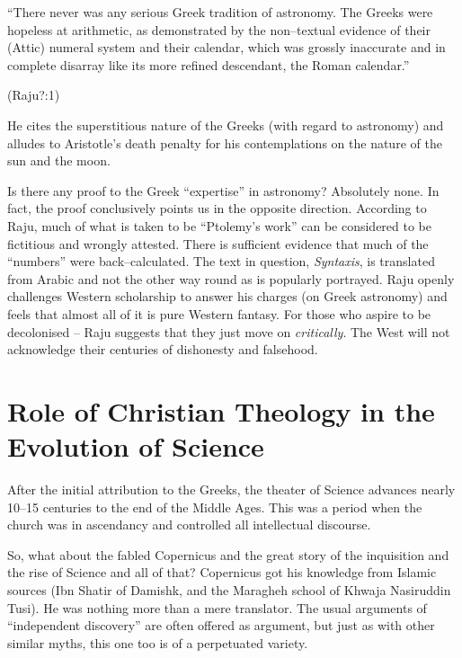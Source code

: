 \begin{myquote}
“There never was any serious Greek tradition of astronomy. The Greeks were hopeless at arithmetic, as demonstrated by the non–textual evidence of their (Attic) numeral system and their calendar, which was grossly inaccurate and in complete disarray like its more refined descendant, the Roman calendar.”
\end{myquote}

\hfill (Raju?:1)

He cites the superstitious nature of the Greeks (with regard to astronomy) and alludes to Aristotle’s death penalty for his contemplations on the nature of the sun and the moon.

Is there any proof to the Greek “expertise” in astronomy? Absolutely none. In fact, the proof conclusively points us in the opposite direction. According to Raju, much of what is taken to be “Ptolemy’s work” can be considered to be fictitious and wrongly attested. There is sufficient evidence that much of the “numbers” were back–calculated. The text in question, \textit{Syntaxis}, is translated from Arabic and not the other way round as is popularly portrayed. Raju openly challenges Western scholarship to answer his charges (on Greek astronomy) and feels that almost all of it is pure Western fantasy. For those who aspire to be decolonised – Raju suggests that they just move on \textit{critically}. The West will not acknowledge their centuries of dishonesty and falsehood.


\section*{Role of Christian Theology in the Evolution of Science}

After the initial attribution to the Greeks, the theater of Science advances nearly 10–15 centuries to the end of the Middle Ages. This was a period when the church was in ascendancy and controlled all intellectual discourse.

So, what about the fabled Copernicus and the great story of the inquisition and the rise of Science and all of that? Copernicus got his knowledge from Islamic sources (Ibn Shatir of Damishk, and the Maragheh school of Khwaja Nasiruddin Tusi). He was nothing more than a mere translator. The usual arguments of “independent discovery” are often offered as argument, but just as with other similar myths, this one too is of a perpetuated variety.


